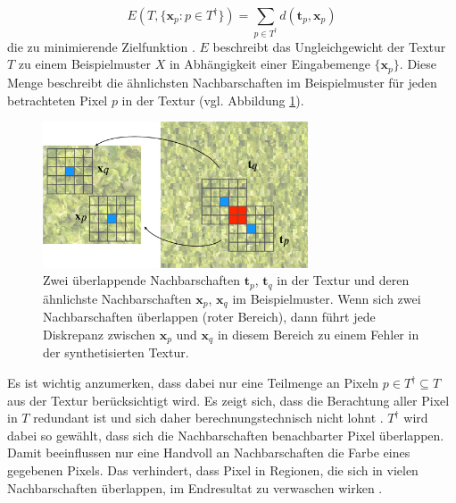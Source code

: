 \begin{equation}
	E(T, \lbrace \textbf{x}_p : p \in T^{\dagger} \rbrace) = \sum_{p \in T^{\dagger}} d(\textbf{t}_p, \textbf{x}_p)
	\label{zielfunktion}
\end{equation}
die zu minimierende Zielfunktion \cite{TextureOptimization}.
$E$ beschreibt das Ungleichgewicht der Textur $T$ zu einem Beispielmuster $X$ in Abhängigkeit einer Eingabemenge $\lbrace \textbf{x}_p \rbrace$.
Diese Menge beschreibt die ähnlichsten Nachbarschaften im Beispielmuster für jeden betrachteten Pixel $p$ in der Textur (vgl. Abbildung \ref{texturoptimierung}).

\begin{figure}
	\centering
	\includegraphics[width=0.7\textwidth]{images/texture-optimization}
	\caption{
		Zwei überlappende Nachbarschaften $\textbf{t}_p$, $\textbf{t}_q$ in der Textur und deren ähnlichste Nachbarschaften $\textbf{x}_p$, $\textbf{x}_q$ im Beispielmuster.
		Wenn sich zwei Nachbarschaften überlappen (roter Bereich), dann führt jede Diskrepanz zwischen $\textbf{x}_p$ und $\textbf{x}_q$ in diesem Bereich zu einem Fehler in der synthetisierten Textur.
		}
	\label{texturoptimierung}
\end{figure}

Es ist wichtig anzumerken, dass dabei nur eine Teilmenge an Pixeln $p \in T^{\dagger} \subseteq T$ aus der Textur berücksichtigt wird.
Es zeigt sich, dass die Berachtung aller Pixel in $T$ redundant ist und sich daher berechnungstechnisch nicht lohnt \cite{TextureOptimization}.
$T^{\dagger}$ wird dabei so gewählt, dass sich die Nachbarschaften benachbarter Pixel überlappen.
Damit beeinflussen nur eine Handvoll an Nachbarschaften die Farbe eines gegebenen Pixels.
Das verhindert, dass Pixel in Regionen, die sich in vielen Nachbarschaften überlappen, im Endresultat zu verwaschen wirken \cite{TextureOptimization}.

